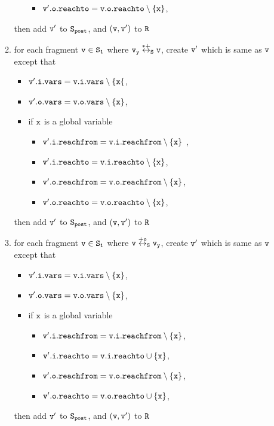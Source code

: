 \begin{itemize}
\begin{enumerate}
\begin{itemize}
\begin{itemize}
\item $\tt v'.o.reachto = v.o.reachto \setminus \{x\}$,
\end{itemize}
\end{itemize}
then add $\tt v'$ to $\tt S_{post}$, and $\tt (v,v')$ to $\tt R$
\item for each fragment $\tt v \in S_1$ where $\tt v_y \overset{*+}\leftrightarrow_S v$, create $\tt v'$ which is same as $\tt v$ except that 
\begin{itemize}
\item $\tt v'.i.vars = v.i.vars \setminus \{x\{$,
\item $\tt v'.o.vars = v.o.vars \setminus \{x\}$,
\item if $\tt x$ is a global variable
\begin{itemize}
\item $\tt v'.i.reachfrom = v.i.reachfrom \setminus \{x\}$ ,
\item $\tt v'.i.reachto = v.i.reachto \setminus \{x\}$,
\item $\tt v'.o.reachfrom = v.o.reachfrom \setminus \{x\}$,
\item $\tt v'.o.reachto = v.o.reachto \setminus \{x\}$,
\end{itemize}
\end{itemize}
then add $\tt v'$ to $\tt S_{post}$, and $\tt (v,v')$ to $\tt R$
\item for each fragment $\tt v \in S_1$ where $\tt v \overset{+o}\leftrightarrow_S v_y$, create $\tt v'$ which is same as $\tt v$ except that 
\begin{itemize}
\item $\tt v'.i.vars = v.i.vars \setminus \{x\}$,
\item $\tt v'.o.vars = v.o.vars \setminus \{x\}$,
\item if $\tt x$ is a global variable
\begin{itemize}
\item $\tt v'.i.reachfrom = v.i.reachfrom \setminus \{x\}$,
\item $\tt v'.i.reachto = v.i.reachto \cup \{x\}$,
 \item $\tt v'.o.reachfrom = v.o.reachfrom \setminus \{x\}$,
 \item $\tt v'.o.reachto = v.o.reachto \cup \{x\}$,
\end{itemize}
\end{itemize}
then add $\tt v'$ to $\tt S_{post}$, and $\tt (v,v')$ to $\tt R$


\end{enumerate}
\end{itemize}
